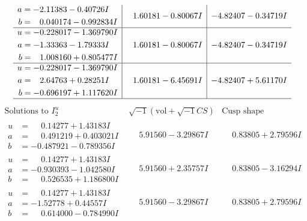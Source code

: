 \documentclass[1p]{elsarticle_modified}
\theoremstyle{definition}
\newcommand{\I}{\sqrt{-1}}
\begin{document}
$$\begin{array}{c|c|c}
\begin{aligned}
a &= -2.11383 - 0.40726 I \\
b &= \phantom{-}0.040174 - 0.992834 I\end{aligned}
 & \phantom{-}1.60181 - 0.80067 I & -4.82407 - 0.34719 I \\ \hline\begin{aligned}
u &= -0.228017 - 1.369790 I \\
a &= -1.33363 - 1.79333 I \\
b &= \phantom{-}1.008160 + 0.805477 I\end{aligned}
 & \phantom{-}1.60181 - 0.80067 I & -4.82407 - 0.34719 I \\ \hline\begin{aligned}
u &= -0.228017 - 1.369790 I \\
a &= \phantom{-}2.64763 + 0.28251 I \\
b &= -0.696197 + 1.117620 I\end{aligned}
 & \phantom{-}1.60181 - 6.45691 I & -4.82407 + 5.61170 I\\
 \hline 
 \end{array}$$\newpage$$\begin{array}{c|c|c}  
\text{Solutions to }I^u_{2}& \I (\text{vol} + \sqrt{-1}CS) & \text{Cusp shape}\\
 \hline 
\begin{aligned}
u &= \phantom{-}0.14277 + 1.43183 I \\
a &= \phantom{-}0.491219 + 0.403021 I \\
b &= -0.487921 - 0.789356 I\end{aligned}
 & \phantom{-}5.91560 - 3.29867 I & \phantom{-}0.83805 + 2.79596 I \\ \hline\begin{aligned}
u &= \phantom{-}0.14277 + 1.43183 I \\
a &= -0.930393 - 1.042580 I \\
b &= \phantom{-}0.526535 + 1.186800 I\end{aligned}
 & \phantom{-}5.91560 + 2.35757 I & \phantom{-}0.83805 - 3.16294 I \\ \hline\begin{aligned}
u &= \phantom{-}0.14277 + 1.43183 I \\
a &= -1.52778 + 0.44557 I \\
b &= \phantom{-}0.614000 - 0.784990 I\end{aligned}
 & \phantom{-}5.91560 - 3.29867 I & \phantom{-}0.83805 + 2.79596 I \\ \hline\begin{aligned}

\end{aligned}
\end{array}$$
\end{document}
